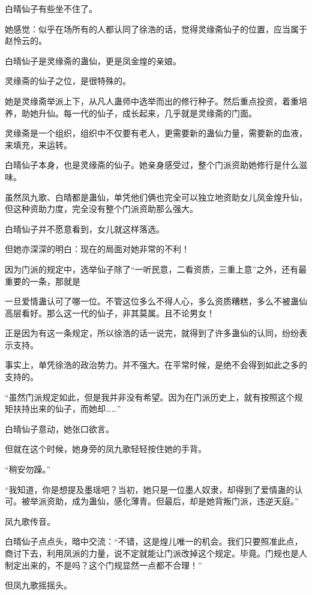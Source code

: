 \begin{this_body}
白晴仙子有些坐不住了。

她感觉：似乎在场所有的人都认同了徐浩的话，觉得灵缘斋仙子的位置，应当属于赵怜云的。

白晴仙子是灵缘斋的蛊仙，更是凤金煌的亲娘。

灵缘斋的仙子之位，是很特殊的。

她是灵缘斋举派上下，从凡人蛊师中选举而出的修行种子。然后重点投资，着重培养，助她升仙。每一代的仙子，成长起来，几乎就是灵缘斋的门面。

灵缘斋是一个组织，组织中不仅要有老人，更需要新的蛊仙力量，需要新的血液，来填充，来运转。

白晴仙子本身，也是灵缘斋的仙子。她亲身感受过，整个门派资助她修行是什么滋味。

虽然凤九歌、白晴都是蛊仙，单凭他们俩也完全可以独立地资助女儿凤金煌升仙，但这种资助力度，完全没有整个门派资助那么强大。

白晴仙子并不愿意看到，女儿就这样落选。

但她亦深深的明白：现在的局面对她非常的不利！

因为门派的规定中，选举仙子除了“一听民意，二看资质，三重上意”之外，还有最重要的一条，那就是

一旦爱情蛊认可了哪一位。不管这位多么不得人心，多么资质糟糕，多么不被蛊仙高层看好。那么这一代的仙子，非其莫属。且不论男女！

正是因为有这一条规定，所以徐浩的话一说完，就得到了许多蛊仙的认同，纷纷表示支持。

事实上，单凭徐浩的政治势力。并不强大。在平常时候，是绝不会得到如此之多的支持的。

“虽然门派规定如此，但是我并非没有希望。因为在门派历史上，就有按照这个规矩扶持出来的仙子，而她却……”

白晴仙子意动，她张口欲言。

但就在这个时候，她身旁的凤九歌轻轻按住她的手背。

“稍安勿躁。”

“我知道，你是想提及墨瑶吧？当初，她只是一位墨人奴隶，却得到了爱情蛊的认可。被举派资助，成为蛊仙，感化薄青。但最后，却是她背叛门派，违逆天庭。”

凤九歌传音。

白晴仙子点点头，暗中交流：“不错，这是煌儿唯一的机会。我们只要照准此点，商讨下去，利用凤派的力量，说不定就能让门派改掉这个规定。毕竟。门规也是人制定出来的，不是吗？这个门规显然一点都不合理！”

但凤九歌摇摇头。


\end{this_body}

